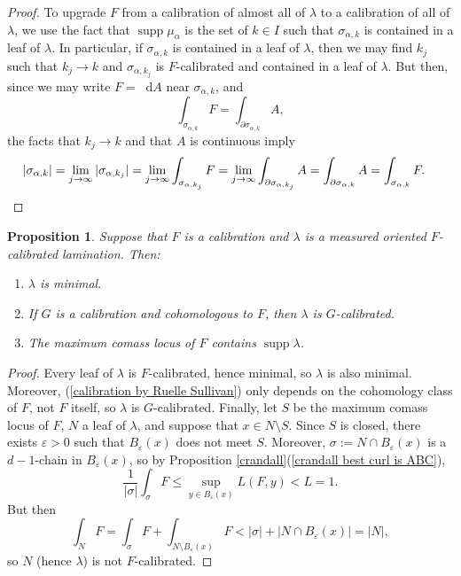 \documentclass[reqno,11pt]{amsart}
\newcommand*\dif{\mathop{}\!\mathrm{d}}
\DeclareMathOperator{\supp}{supp}
\newtheorem{proposition}[theorem]{Proposition}
\theoremstyle{definition}
\numberwithin{equation}{section}
\begin{document}
\begin{proof}
To upgrade $F$ from a calibration of almost all of $\lambda$ to a calibration of all of $\lambda$, we use the fact that $\supp \mu_\alpha$ is the set of $k \in I$ such that $\sigma_{\alpha, k}$ is contained in a leaf of $\lambda$.
In particular, if $\sigma_{\alpha, k}$ is contained in a leaf of $\lambda$, then we may find $k_j$ such that $k_j \to k$ and $\sigma_{\alpha, k_j}$ is $F$-calibrated and contained in a leaf of $\lambda$.
But then, since we may write $F = \dif A$ near $\sigma_{\alpha, k}$, and 
$$\int_{\sigma_{\alpha, k}} F = \int_{\partial \sigma_{\alpha, k}} A,$$
the facts that $k_j \to k$ and that $A$ is continuous imply 
\begin{align*}
|\sigma_{\alpha, k}| &= \lim_{j \to \infty} |\sigma_{\alpha, k_j}| = \lim_{j \to \infty} \int_{\sigma_{\alpha, k_j}} F = \lim_{j \to \infty} \int_{\partial \sigma_{\alpha, k_j}} A = \int_{\partial \sigma_{\alpha, k}} A = \int_{\sigma_{\alpha, k}} F. \qedhere 
\end{align*}
\end{proof}

\begin{proposition}\label{properties of calibrated laminations}
Suppose that $F$ is a calibration and $\lambda$ is a measured oriented $F$-calibrated lamination.
Then:
\begin{enumerate}
\item $\lambda$ is minimal.
\item If $G$ is a calibration and cohomologous to $F$, then $\lambda$ is $G$-calibrated.
\item The maximum comass locus of $F$ contains $\supp \lambda$.
\end{enumerate}
\end{proposition}
\begin{proof}
Every leaf of $\lambda$ is $F$-calibrated, hence minimal, so $\lambda$ is also minimal.
Moreover, (\ref{calibration by Ruelle Sullivan}) only depends on the cohomology class of $F$, not $F$ itself, so $\lambda$ is $G$-calibrated.
Finally, let $S$ be the maximum comass locus of $F$, $N$ a leaf of $\lambda$, and suppose that $x \in N \setminus S$.
Since $S$ is closed, there exists $\varepsilon > 0$ such that $B_\varepsilon(x)$ does not meet $S$.
Moreover, $\sigma := N \cap B_\varepsilon(x)$ is a $d-1$-chain in $B_\varepsilon(x)$, so by Proposition \ref{crandall}(\ref{crandall best curl is ABC}),
$$\frac{1}{|\sigma|} \int_\sigma F \leq \sup_{y \in B_\varepsilon(x)} L(F, y) < L = 1.$$
But then 
$$\int_N F = \int_\sigma F + \int_{N \setminus B_\varepsilon(x)} F < |\sigma| + |N \cap B_\varepsilon(x)| = |N|,$$
so $N$ (hence $\lambda$) is not $F$-calibrated.
\end{proof}
\end{document}
